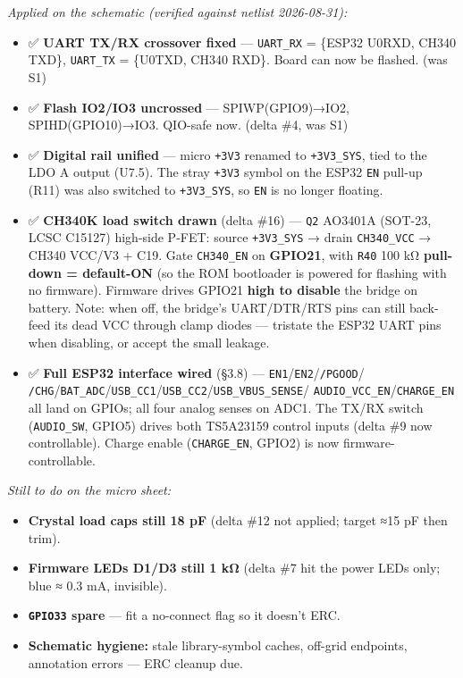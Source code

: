 \documentclass[11pt]{article}
\begin{document}
\textit{Applied on the schematic (verified against netlist 2026-08-31):}
\begin{itemize}[leftmargin=1.4em]
\item ✅ \textbf{UART TX/RX crossover fixed} — \texttt{UART_RX} = \{ESP32 U0RXD, CH340 TXD\},
  \texttt{UART_TX} = \{U0TXD, CH340 RXD\}. Board can now be flashed. (was S1)
\item ✅ \textbf{Flash IO2/IO3 uncrossed} — SPIWP(GPIO9)→IO2, SPIHD(GPIO10)→IO3. QIO-safe now.
  (delta \#4, was S1)
\item ✅ \textbf{Digital rail unified} — micro \texttt{+3V3} renamed to \texttt{+3V3_SYS}, tied to the
  LDO A output (U7.5). The stray \texttt{+3V3} symbol on the ESP32 \texttt{EN} pull-up (R11) was also
  switched to \texttt{+3V3_SYS}, so \texttt{EN} is no longer floating.
\item ✅ \textbf{CH340K load switch drawn} (delta \#16) — \texttt{Q2} AO3401A (SOT-23, LCSC C15127)
  high-side P-FET: source \texttt{+3V3_SYS} → drain \texttt{CH340_VCC} → CH340 VCC/V3 + C19. Gate
  \texttt{CH340_EN} on \textbf{GPIO21}, with \texttt{R40} 100 kΩ \textbf{pull-down = default-ON} (so
  the ROM bootloader is powered for flashing with no firmware). Firmware drives GPIO21 \textbf{high to
  disable} the bridge on battery. Note: when off, the bridge's UART/DTR/RTS pins can still back-feed
  its dead VCC through clamp diodes — tristate the ESP32 UART pins when disabling, or accept the small
  leakage.
\item ✅ \textbf{Full ESP32 interface wired} (§3.8) — \texttt{EN1}/\texttt{EN2}/\texttt{/PGOOD}/%
  \texttt{/CHG}/\texttt{BAT_ADC}/\texttt{USB_CC1}/\texttt{USB_CC2}/\texttt{USB_VBUS_SENSE}/%
  \texttt{AUDIO_VCC_EN}/\texttt{CHARGE_EN} all land on GPIOs; all four analog senses on ADC1. The
  TX/RX switch (\texttt{AUDIO_SW}, GPIO5) drives both TS5A23159 control inputs (delta \#9 now
  controllable). Charge enable (\texttt{CHARGE_EN}, GPIO2) is now firmware-controllable.
\end{itemize}

\textit{Still to do on the micro sheet:}
\begin{itemize}[leftmargin=1.4em]
\item \textbf{Crystal load caps still 18 pF} (delta \#12 not applied; target ≈15 pF then trim).
\item \textbf{Firmware LEDs D1/D3 still 1 kΩ} (delta \#7 hit the power LEDs only; blue ≈ 0.3 mA,
  invisible).
\item \textbf{\texttt{GPIO33} spare} — fit a no-connect flag so it doesn't ERC.
\item \textbf{Schematic hygiene:} stale library-symbol caches, off-grid endpoints, annotation
  errors — ERC cleanup due.
\end{itemize}
\end{document}
